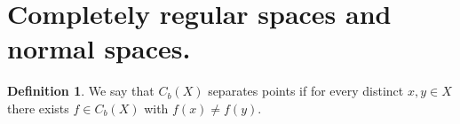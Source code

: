 \documentclass[11pt,a4paper]{article}
\theoremstyle{definition}
\newtheorem{definition}{Definition}[section]
\theoremstyle{plain}
\begin{document}
  \newpage

  \section{Completely regular spaces and normal spaces.}
  \begin{definition}
    We say that $C_b(X)$ separates points if for every distinct 
    $x, y \in X$ there exists $f \in C_b(X)$ with $f(x) \neq f(y)$.
  \end{definition}  
  
  
\end{document}
